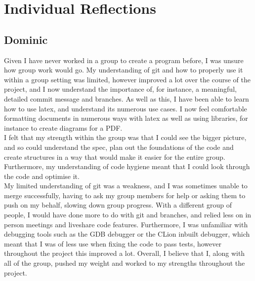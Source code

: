 \documentclass [10pt] {article}
\begin{document}
\section*{Individual Reflections}

\subsection*{Dominic}
Given I have never worked in a group to create a program before,  I was unsure how group work would go. My understanding of git and how to properly use it within a group setting was limited, however improved a lot over the course of the project, and I now understand the importance of, for instance, a meaningful, detailed commit message and branches. As well as this, I have been able to learn how to use latex, and understand its numerous use cases. I now feel comfortable formatting documents in numerous ways with latex as well as using libraries, for instance to create diagrams for a PDF.
\vspace {0.3cm}
\\
I felt that my strength within the group was that I could see the bigger picture, and so could understand the spec, plan out the foundations of the code and create structures in a way that would make it easier for the entire group. Furthermore, my understanding of code hygiene meant that I could look through the code and optimise it.
\vspace {0.3cm}
\\
My limited understanding of git was a weakness, and I was sometimes unable to merge successfully, having to ask my group members for help or asking them to push on my behalf, slowing down group progress. With a different group of people, I would have done more to do with git and branches, and relied less on in person meetings and liveshare code features. Furthermore, I was unfamiliar with debugging tools such as the GDB debugger or the CLion inbuilt debugger, which meant that I was of less use when fixing the code to pass tests, however throughout the project this improved a lot. Overall, I believe that I, along with all of the group, pushed my weight and worked to my strengths throughout the project.
\end{document}

